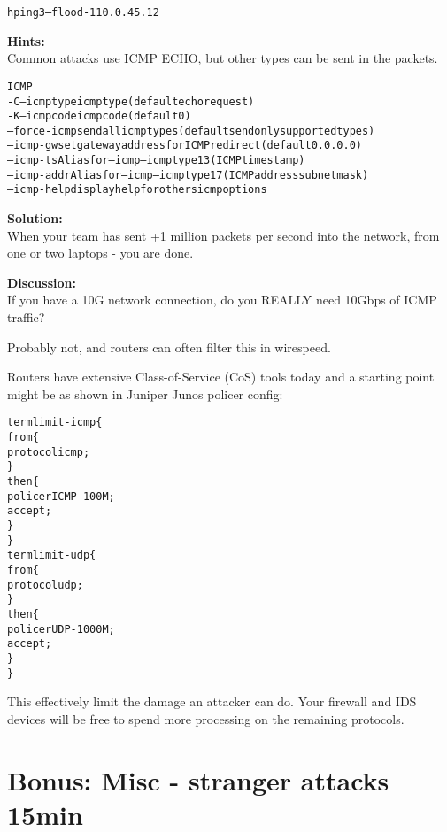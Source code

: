 \documentclass[a4paper,11pt,notitlepage]{report}
\begin{document}
\begin{alltt}\footnotesize
hping3 --flood -1 10.0.45.12
\end{alltt}





{\bf Hints:}\\
Common attacks use ICMP ECHO, but other types can be sent in the packets.

\begin{alltt}\footnotesize
ICMP
  -C  --icmptype   icmp type (default echo request)
  -K  --icmpcode   icmp code (default 0)
      --force-icmp send all icmp types (default send only supported types)
      --icmp-gw    set gateway address for ICMP redirect (default 0.0.0.0)
      --icmp-ts    Alias for --icmp --icmptype 13 (ICMP timestamp)
      --icmp-addr  Alias for --icmp --icmptype 17 (ICMP address subnet mask)
      --icmp-help  display help for others icmp options
\end{alltt}


{\bf Solution:}\\
When your team has sent +1 million packets per second into the network, from one or two laptops - you are done.

{\bf Discussion:}\\
If you have a 10G network connection, do you REALLY need 10Gbps of ICMP traffic?

Probably not, and routers can often filter this in wirespeed.

Routers have extensive Class-of-Service (CoS) tools today and a starting point might be as shown in Juniper Junos policer config:

\begin{alltt}\footnotesize
term limit-icmp \{
    from \{
        protocol icmp;
    \}
    then \{
        policer ICMP-100M;
        accept;
    \}
\}
term limit-udp \{
    from \{
        protocol udp;
    \}
    then \{
        policer UDP-1000M;
        accept;
    \}
\}
\end{alltt}

This effectively limit the damage an attacker can do. Your firewall and IDS devices will be free to spend more processing on the remaining protocols.



\chapter{Bonus: Misc - stranger attacks 15min}
\end{document}
